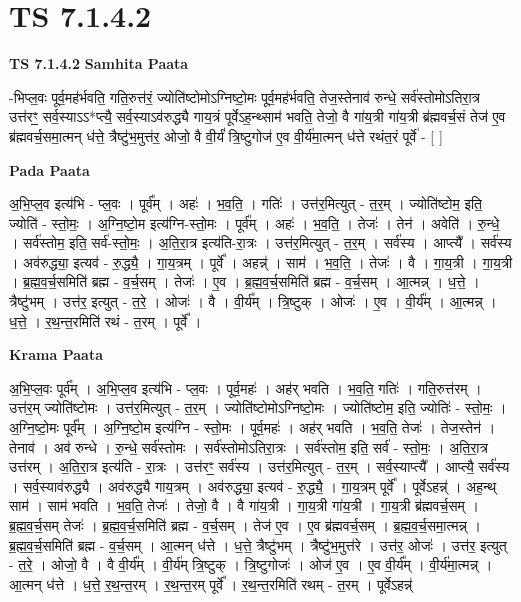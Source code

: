 \documentclass[17pt]{extarticle}
\begin{document}
\section{ TS 7.1.4.2 }

\textbf{TS 7.1.4.2 } \newline
\textbf{Samhita Paata} \newline

-भिप्ल॒वः पूर्व॒मह॑र्भवति॒ गति॒रुत्त॑रं॒ ज्योति॑ष्टोमोऽग्निष्टो॒मः पूर्व॒मह॑र्भवति॒ तेज॒स्तेनाव॑ रुन्धे॒ सर्व॑स्तोमोऽतिरा॒त्र उत्त॑रꣳ॒॒ सर्व॒स्याऽऽ*प्त्यै॒ सर्व॒स्याऽव॑रुद्ध्यै गाय॒त्रं पूर्वेऽह॒न्थ्साम॑ भवति॒ तेजो॒ वै गा॑य॒त्री गा॑य॒त्री ब्र॑ह्मवर्च॒सं तेज॑ ए॒व ब्र॑ह्मवर्च॒समा॒त्मन् ध॑त्ते॒ त्रैष्टु॑भ॒मुत्त॑र॒ ओजो॒ वै वी॒र्यं॑ त्रि॒ष्टुगोज॑ ए॒व वी॒र्य॑मा॒त्मन् ध॑त्ते रथंत॒रं पूर्वे॑ - [  ] \newline

\textbf{Pada Paata} \newline

अ॒भि॒प्ल॒व इत्य॑भि - प्ल॒वः । पूर्व᳚म् । अहः॑ । भ॒व॒ति॒ । गतिः॑ । उत्त॑र॒मित्युत् - त॒र॒म् । ज्योति॑ष्टोम॒ इति॒ ज्योति॑ - स्तो॒मः॒ । अ॒ग्नि॒ष्टो॒म इत्य॑ग्नि-स्तो॒मः । पूर्व᳚म् । अहः॑ । भ॒व॒ति॒ । तेजः॑ । तेन॑ । अवेति॑ । रु॒न्धे॒ । सर्व॑स्तोम॒ इति॒ सर्व॑-स्तो॒मः॒ । अ॒ति॒रा॒त्र इत्य॑ति-रा॒त्रः । उत्त॑र॒मित्युत् - त॒र॒म् । सर्व॑स्य । आप्त्यै᳚ । सर्व॑स्य । अव॑रुद्ध्या॒ इत्यव॑ - रु॒द्ध्यै॒ । गा॒य॒त्रम् । पूर्वे᳚ । अहन्न्॑ । साम॑ । भ॒व॒ति॒ । तेजः॑ । वै । गा॒य॒त्री । गा॒य॒त्री । ब्र॒ह्म॒व॒र्च॒समिति॑ ब्रह्म - व॒र्च॒सम् । तेजः॑ । ए॒व । ब्र॒ह्म॒व॒र्च॒समिति॑ ब्रह्म - व॒र्च॒सम् । आ॒त्मन्न् । ध॒त्ते॒ । त्रैष्टु॑भम् । उत्त॑र॒ इत्युत् - त॒रे॒ । ओजः॑ । वै । वी॒र्य᳚म् । त्रि॒ष्टुक् । ओजः॑ । ए॒व । वी॒र्य᳚म् । आ॒त्मन्न् । ध॒त्ते॒ । र॒थ॒न्त॒रमिति॑ रथं - त॒रम् । पूर्वे᳚ ।  \newline


\textbf{Krama Paata} \newline

अ॒भि॒प्ल॒वः पूर्व᳚म् । अ॒भि॒प्ल॒व इत्य॑भि - प्ल॒वः । पूर्व॒महः॑ । अह॑र् भवति । भ॒व॒ति॒ गतिः॑ । गति॒रुत्त॑रम् । उत्त॑र॒म् ज्योति॑ष्टोमः । उत्त॑र॒मित्युत् - त॒र॒म् । ज्योति॑ष्टोमोऽग्निष्टो॒मः । ज्योति॑ष्टोम॒ इति॒ ज्योतिः॑ - स्तो॒मः॒ । अ॒ग्नि॒ष्टो॒मः पूर्व᳚म् । अ॒ग्नि॒ष्टो॒म इत्य॑ग्नि - स्तो॒मः । पूर्व॒महः॑ । अह॑र् भवति । भ॒व॒ति॒ तेजः॑ । तेज॒स्तेन॑ । तेनाव॑ । अव॑ रुन्धे । रु॒न्धे॒ सर्व॑स्तोमः । सर्व॑स्तोमोऽतिरा॒त्रः । सर्व॑स्तोम॒ इति॒ सर्व॑ - स्तो॒मः॒ । अ॒ति॒रा॒त्र उत्त॑रम् । अ॒ति॒रा॒त्र इत्य॑ति - रा॒त्रः । उत्त॑रꣳ॒॒ सर्व॑स्य । उत्त॑र॒मित्युत् - त॒र॒म् । सर्व॒स्याप्त्यै᳚ । आप्त्यै॒ सर्व॑स्य । सर्व॒स्याव॑रुद्ध्यै । अव॑रुद्ध्यै गाय॒त्रम् । अव॑रुद्ध्या॒ इत्यव॑ - रु॒द्ध्यै॒ । गा॒य॒त्रम् पूर्वे᳚ । पूर्वेऽहन्न्॑ । अह॒न्थ् साम॑ । साम॑ भवति । भ॒व॒ति॒ तेजः॑ । तेजो॒ वै । वै गा॑य॒त्री । गा॒य॒त्री गा॑य॒त्री । गा॒य॒त्री ब्र॑ह्मवर्च॒सम् । ब्र॒ह्म॒व॒र्च॒सम् तेजः॑ । ब्र॒ह्म॒व॒र्च॒समिति॑ ब्रह्म - व॒र्च॒सम् । तेज॑ ए॒व । ए॒व ब्र॑ह्मवर्च॒सम् । ब्र॒ह्म॒व॒र्च॒समा॒त्मन्न् । ब्र॒ह्म॒व॒र्च॒समिति॑ ब्रह्म - व॒र्च॒सम् । आ॒त्मन् ध॑त्ते । ध॒त्ते॒ त्रैष्टु॑भम् । त्रैष्टु॑भ॒मुत्त॑रे । उत्त॑र॒ ओजः॑ । उत्त॑र॒ इत्युत् - त॒रे॒ । ओजो॒ वै । वै वी॒र्य᳚म् । वी॒र्य॑म् त्रि॒ष्टुक् । त्रि॒ष्टुगोजः॑ । ओज॑ ए॒व । ए॒व वी॒र्य᳚म् । वी॒र्य॑मा॒त्मन्न् । आ॒त्मन् ध॑त्ते । ध॒त्ते॒ र॒थ॒न्त॒रम् । र॒थ॒न्त॒रम् पूर्वे᳚ । र॒थ॒न्त॒रमिति॑ रथम् - त॒रम् । पूर्वेऽहन्न्॑ \newline
\end{document}
